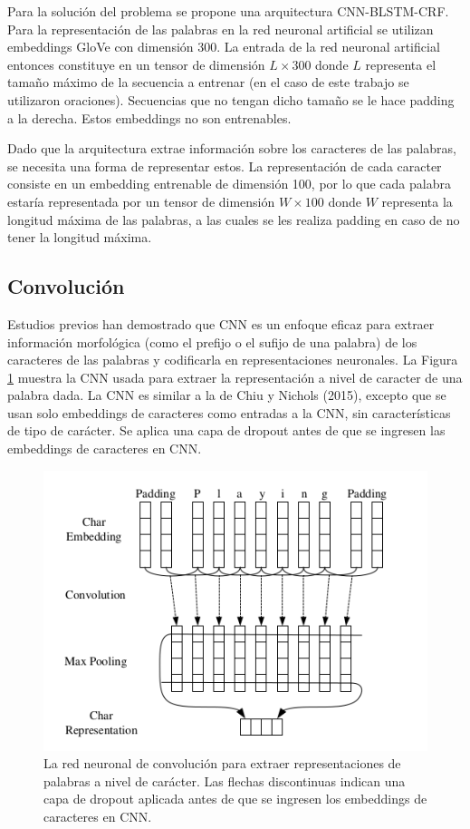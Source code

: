 \documentclass[runningheads]{llncs}
\begin{document}
Para la solución del problema se propone una arquitectura CNN-BLSTM-CRF. Para la representación
de las palabras en la red neuronal artificial se utilizan embeddings GloVe con dimensión 300.
La entrada de la red neuronal artificial entonces constituye en un tensor de dimensión 
$L \times 300$ donde $L$ representa el tamaño máximo de la secuencia a entrenar (en el caso de este trabajo
se utilizaron oraciones). Secuencias que no tengan dicho tamaño se le hace padding a la derecha. 
Estos embeddings no son entrenables.

Dado que la arquitectura extrae información sobre los caracteres de las palabras, se necesita
una forma de representar estos. La representación de cada caracter consiste en un embedding
entrenable de dimensión 100, por lo que cada palabra estaría representada por un tensor de
dimensión $W \times 100$ donde $W$ representa la longitud máxima de las palabras, a las cuales se
les realiza padding en caso de no tener la longitud máxima.

\subsection{Convolución}

Estudios previos han demostrado que CNN es un 
enfoque eficaz para extraer información morfológica (como el prefijo o el sufijo de una palabra) 
de los caracteres de las palabras y codificarla en representaciones neuronales. La Figura \ref{F1} muestra 
la CNN usada para extraer la representación a nivel de caracter de una palabra dada. La CNN 
es similar a la de Chiu y Nichols (2015), excepto que se usan solo embeddings de caracteres como 
entradas a la CNN, sin características de tipo de carácter. Se aplica una capa de dropout antes de que se ingresen las embeddings de caracteres en CNN.

\begin{figure}
	\centering
	\includegraphics[width=12cm]{Fig_1.png}
	\caption{ La red neuronal de convolución para extraer representaciones de palabras 
	a nivel de carácter. Las flechas discontinuas indican una capa de dropout aplicada antes 
	de que se ingresen los embeddings de caracteres en CNN.}
	\label{F1}
\end{figure}
\end{document}
